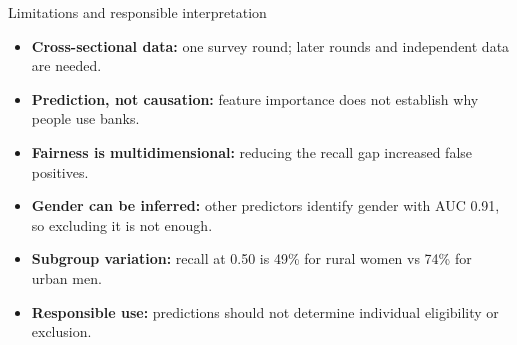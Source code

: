\documentclass[aspectratio=169,10pt]{beamer}
\begin{document}

\begin{frame}{Limitations and responsible interpretation}

\begin{itemize}

    \item \textbf{Cross-sectional data:}
    one survey round; later rounds and independent data are needed.

    \item \textbf{Prediction, not causation:}
    feature importance does not establish why people use banks.

    \item \textbf{Fairness is multidimensional:}
    reducing the recall gap increased false positives.

    \item \textbf{Gender can be inferred:}
    other predictors identify gender with AUC 0.91, so excluding it is not enough.

    \item \textbf{Subgroup variation:}
    recall at 0.50 is 49\% for rural women vs 74\% for urban men.

    \item \textbf{Responsible use:}
    predictions should not determine individual eligibility or exclusion.

\end{itemize}

\end{frame}

\end{document}
